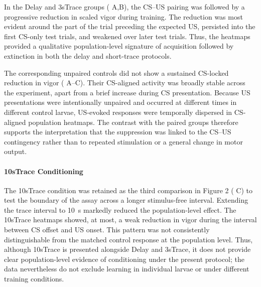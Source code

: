 In the Delay and 3sTrace groups ( A,B), the CS--US pairing was followed by a progressive reduction in scaled vigor during training. The reduction was most evident around the part of the trial preceding the expected US, persisted into the first CS-only test trials, and weakened over later test trials. Thus, the heatmaps provided a qualitative population-level signature of acquisition followed by extinction in both the delay and short-trace protocols.

The corresponding unpaired controls did not show a sustained CS-locked reduction in vigor ( A--C). Their CS-aligned activity was broadly stable across the experiment, apart from a brief increase during CS presentation. Because US presentations were intentionally unpaired and occurred at different times in different control larvae, US-evoked responses were temporally dispersed in CS-aligned population heatmaps. The contrast with the paired groups therefore supports the interpretation that the suppression was linked to the CS--US contingency rather than to repeated stimulation or a general change in motor output.

\paragraph{10sTrace Conditioning}

The 10sTrace condition was retained as the third comparison in Figure 2 ( C) to test the boundary of the assay across a longer stimulus-free interval. Extending the trace interval to \SI{10}{\second} markedly reduced the population-level effect. The 10sTrace heatmaps showed, at most, a weak reduction in vigor during the interval between CS offset and US onset. This pattern was not consistently distinguishable from the matched control response at the population level. Thus, although 10sTrace is presented alongside Delay and 3sTrace, it does not provide clear population-level evidence of conditioning under the present protocol; the data nevertheless do not exclude learning in individual larvae or under different training conditions.

